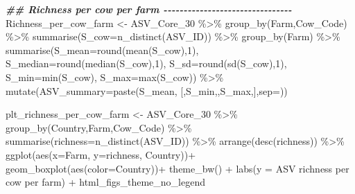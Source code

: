 \documentclass[
]{article}
\newenvironment{Shaded}{\begin{snugshade}}{\end{snugshade}}
\newcommand{\AttributeTok}[1]{\textcolor[rgb]{0.77,0.63,0.00}{#1}}
\newcommand{\DecValTok}[1]{\textcolor[rgb]{0.00,0.00,0.81}{#1}}
\newcommand{\DocumentationTok}[1]{\textcolor[rgb]{0.56,0.35,0.01}{\textbf{\textit{#1}}}}
\newcommand{\FunctionTok}[1]{\textcolor[rgb]{0.00,0.00,0.00}{#1}}
\newcommand{\NormalTok}[1]{#1}
\newcommand{\OtherTok}[1]{\textcolor[rgb]{0.56,0.35,0.01}{#1}}
\newcommand{\SpecialCharTok}[1]{\textcolor[rgb]{0.00,0.00,0.00}{#1}}
\newcommand{\StringTok}[1]{\textcolor[rgb]{0.31,0.60,0.02}{#1}}
\begin{document}
\begin{Shaded}
\begin{Highlighting}[]
\DocumentationTok{\#\# Richness per cow per farm   {-}{-}{-}{-}{-}{-}{-}{-}{-}{-}{-}{-}{-}{-}{-}{-}{-}{-}{-}{-}{-}{-}{-}{-}{-}{-}{-}{-}{-}{-}{-}{-}}
\NormalTok{Richness\_per\_cow\_farm }\OtherTok{\textless{}{-}} 
\NormalTok{ASV\_Core\_30 }\SpecialCharTok{\%\textgreater{}\%}
  \FunctionTok{group\_by}\NormalTok{(Farm,Cow\_Code) }\SpecialCharTok{\%\textgreater{}\%}
  \FunctionTok{summarise}\NormalTok{(}\AttributeTok{S\_cow=}\FunctionTok{n\_distinct}\NormalTok{(ASV\_ID)) }\SpecialCharTok{\%\textgreater{}\%} 
  \FunctionTok{group\_by}\NormalTok{(Farm) }\SpecialCharTok{\%\textgreater{}\%} 
  \FunctionTok{summarise}\NormalTok{(}\AttributeTok{S\_mean=}\FunctionTok{round}\NormalTok{(}\FunctionTok{mean}\NormalTok{(S\_cow),}\DecValTok{1}\NormalTok{),}
            \AttributeTok{S\_median=}\FunctionTok{round}\NormalTok{(}\FunctionTok{median}\NormalTok{(S\_cow),}\DecValTok{1}\NormalTok{),}
            \AttributeTok{S\_sd=}\FunctionTok{round}\NormalTok{(}\FunctionTok{sd}\NormalTok{(S\_cow),}\DecValTok{1}\NormalTok{),}
            \AttributeTok{S\_min=}\FunctionTok{min}\NormalTok{(S\_cow),}
            \AttributeTok{S\_max=}\FunctionTok{max}\NormalTok{(S\_cow)) }\SpecialCharTok{\%\textgreater{}\%} 
  \FunctionTok{mutate}\NormalTok{(}\AttributeTok{ASV\_summary=}\FunctionTok{paste}\NormalTok{(S\_mean,}\StringTok{\textquotesingle{} [\textquotesingle{}}\NormalTok{,S\_min,}\StringTok{\textquotesingle{}{-}\textquotesingle{}}\NormalTok{,S\_max,}\StringTok{\textquotesingle{}]\textquotesingle{}}\NormalTok{,}\AttributeTok{sep=}\StringTok{\textquotesingle{}\textquotesingle{}}\NormalTok{))}

\NormalTok{plt\_richness\_per\_cow\_farm }\OtherTok{\textless{}{-}} 
\NormalTok{ASV\_Core\_30 }\SpecialCharTok{\%\textgreater{}\%}
  \FunctionTok{group\_by}\NormalTok{(Country,Farm,Cow\_Code) }\SpecialCharTok{\%\textgreater{}\%}
  \FunctionTok{summarise}\NormalTok{(}\AttributeTok{richness=}\FunctionTok{n\_distinct}\NormalTok{(ASV\_ID)) }\SpecialCharTok{\%\textgreater{}\%}
  \FunctionTok{arrange}\NormalTok{(}\FunctionTok{desc}\NormalTok{(richness)) }\SpecialCharTok{\%\textgreater{}\%} 
  \FunctionTok{ggplot}\NormalTok{(}\FunctionTok{aes}\NormalTok{(}\AttributeTok{x=}\NormalTok{Farm, }\AttributeTok{y=}\NormalTok{richness, Country))}\SpecialCharTok{+}
  \FunctionTok{geom\_boxplot}\NormalTok{(}\FunctionTok{aes}\NormalTok{(}\AttributeTok{color=}\NormalTok{Country))}\SpecialCharTok{+}
  \FunctionTok{theme\_bw}\NormalTok{() }\SpecialCharTok{+}
  \FunctionTok{labs}\NormalTok{(}\AttributeTok{y =} \StringTok{\textquotesingle{}ASV richness per cow per farm\textquotesingle{}}\NormalTok{) }\SpecialCharTok{+}
\NormalTok{  html\_figs\_theme\_no\_legend}
\end{Highlighting}
\end{Shaded}
\end{document}
